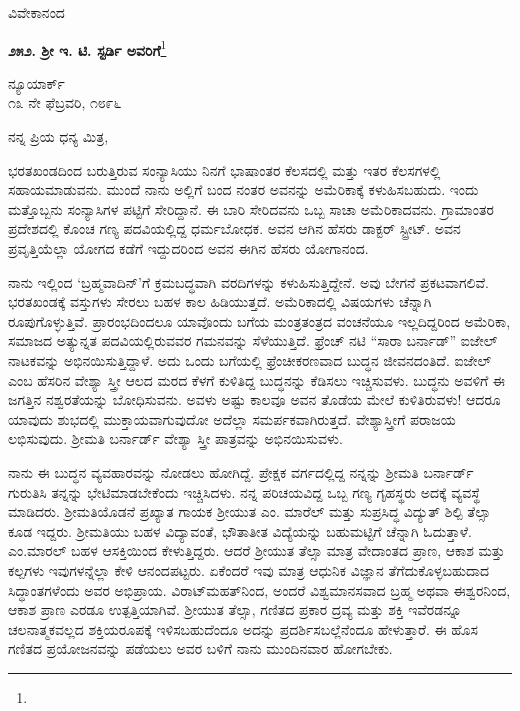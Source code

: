 {\flushright
ವಿವೇಕಾನಂದ\par}

\begin{center}
\textbf{೨೫೨. ಶ‍್ರೀ ಇ. ಟಿ. ಸ್ಟರ್ಡಿ ಅವರಿಗೆ}\footnote{}
\end{center}

\vspace{-0.5cm}

\begin{flushright}
ನ್ಯೂಯಾರ್ಕ್\\೧೩ ನೇ ಫೆಬ್ರವರಿ, ೧೮೯೬
\end{flushright}

\vspace{-0.5cm}

\noindent
ನನ್ನ ಪ್ರಿಯ ಧನ್ಯ ಮಿತ್ರ,

ಭರತಖಂಡದಿಂದ ಬರುತ್ತಿರುವ ಸಂನ್ಯಾಸಿಯು ನಿನಗೆ ಭಾಷಾಂತರ ಕೆಲಸದಲ್ಲಿ ಮತ್ತು ಇತರ ಕೆಲಸಗಳಲ್ಲಿ ಸಹಾಯಮಾಡುವನು. ಮುಂದೆ ನಾನು ಅಲ್ಲಿಗೆ ಬಂದ ನಂತರ ಅವನನ್ನು ಅಮೆರಿಕಾಕ್ಕೆ ಕಳುಹಿಸಬಹುದು. ಇಂದು ಮತ್ತೊಬ್ಬನು ಸಂನ್ಯಾಸಿಗಳ ಪಟ್ಟಿಗೆ ಸೇರಿದ್ದಾನೆ. ಈ ಬಾರಿ ಸೇರಿದವನು ಒಬ್ಬ ಸಾಚಾ ಅಮೆರಿಕಾದವನು. ಗ್ರಾಮಾಂತರ ಪ್ರದೇಶದಲ್ಲಿ ಕೊಂಚ ಗಣ್ಯ ಪದವಿಯಲ್ಲಿದ್ದ ಧರ್ಮಬೋಧಕ. ಅವನ ಆಗಿನ ಹೆಸರು ಡಾಕ್ಟರ್ ಸ್ಟ್ರೀಟ್. ಅವನ ಪ್ರವೃತ್ತಿಯೆಲ್ಲಾ ಯೋಗದ ಕಡೆಗೆ ಇದ್ದುದರಿಂದ ಅವನ ಈಗಿನ ಹೆಸರು ಯೋಗಾನಂದ.

ನಾನು ಇಲ್ಲಿಂದ ‘ಬ್ರಹ್ಮವಾದಿನ್’ಗೆ ಕ್ರಮಬದ್ಧವಾಗಿ ವರದಿಗಳನ್ನು ಕಳುಹಿಸುತ್ತಿದ್ದೇನೆ. ಅವು ಬೇಗನೆ ಪ್ರಕಟವಾಗಲಿವೆ. ಭರತಖಂಡಕ್ಕೆ ವಸ್ತುಗಳು ಸೇರಲು ಬಹಳ ಕಾಲ ಹಿಡಿಯುತ್ತದೆ. ಅಮೆರಿಕಾದಲ್ಲಿ ವಿಷಯಗಳು ಚೆನ್ನಾಗಿ ರೂಪುಗೊಳ್ಳುತ್ತಿವೆ. ಪ್ರಾರಂಭದಿಂದಲೂ ಯಾವೊಂದು ಬಗೆಯ ಮಂತ್ರತಂತ್ರದ ವಂಚನೆಯೂ ಇಲ್ಲದಿದ್ದರಿಂದ ಅಮೆರಿಕಾ, ಸಮಾಜ\break ದ ಅತ್ಯುನ್ನತ ಪದವಿಯಲ್ಲಿರುವವರ ಗಮನವನ್ನು ಸೆಳೆಯುತ್ತಿದೆ. ಫ್ರೆಂಚ್ ನಟಿ “ಸಾರಾ ಬರ್ನಾಡ್” ಐಜೇಲ್ ನಾಟಕವನ್ನು ಅಭಿನಯಿಸುತ್ತಿದ್ದಾಳೆ. ಅದು ಒಂದು ಬಗೆಯಲ್ಲಿ ಫ್ರೆಂಚೀಕರಣವಾದ ಬುದ್ಧನ ಜೀವನದಂತಿದೆ. ಐಜೇಲ್ ಎಂಬ ಹೆಸರಿನ ವೇಶ್ಯಾ ಸ್ತ್ರೀ ಆಲದ ಮರದ ಕೆಳಗೆ ಕುಳಿತಿದ್ದ ಬುದ್ಧನನ್ನು ಕೆಡಿಸಲು ಇಚ್ಚಿಸುವಳು. ಬುದ್ಧನು ಅವಳಿಗೆ ಈ ಜಗತ್ತಿನ ನಶ್ವರತೆಯನ್ನು ಬೋಧಿಸುವನು. ಅವಳು ಅಷ್ಟು ಕಾಲವೂ ಅವನ ತೊಡೆಯ ಮೇಲೆ ಕುಳಿತಿರುವಳು! ಆದರೂ ಯಾವುದು ಶುಭದಲ್ಲಿ ಮುಕ್ತಾಯವಾಗುವುದೋ ಅದೆಲ್ಲಾ ಸಮರ್ಪಕವಾಗಿರುತ್ತದೆ. ವೇಶ್ಯಾಸ್ತ್ರೀಗೆ ಪರಾಜಯ ಲಭಿಸುವುದು. ಶ‍್ರೀಮತಿ ಬರ್ನಾರ್ಡ್ ವೇಶ್ಯಾ ಸ್ತ್ರೀ ಪಾತ್ರವನ್ನು ಅಭಿನಯಿಸುವಳು.

ನಾನು ಈ ಬುದ್ಧನ ವ್ಯವಹಾರವನ್ನು ನೋಡಲು ಹೋಗಿದ್ದೆ. ಪ್ರೇಕ್ಷಕ ವರ್ಗದಲ್ಲಿದ್ದ ನನ್ನನ್ನು ಶ‍್ರೀಮತಿ ಬರ್ನಾರ್ಡ್ ಗುರುತಿಸಿ ತನ್ನನ್ನು ಭೇಟಿಮಾಡಬೇಕೆಂದು ಇಚ್ಚಿಸಿದಳು. ನನ್ನ ಪರಿಚಯವಿದ್ದ ಒಬ್ಬ ಗಣ್ಯ ಗೃಹಸ್ಥರು ಅದಕ್ಕೆ ವ್ಯವಸ್ಥೆ ಮಾಡಿದರು. ಶ‍್ರೀಮತಿಯೊಡನೆ ಪ್ರಖ್ಯಾತ ಗಾಯಕ ಶ‍್ರೀಯುತ ಎಂ. ಮಾರೆಲ್ ಮತ್ತು ಸುಪ್ರಸಿದ್ಧ ವಿದ್ಯುತ್ ಶಿಲ್ಪಿ ತೆಲ್ಸಾ ಕೂಡ ಇದ್ದರು. ಶ‍್ರೀಮತಿಯು ಬಹಳ ವಿದ್ಯಾವಂತೆ, ಭೌತಾತೀತ ವಿದ್ಯೆಯನ್ನು ಬಹುಮಟ್ಟಿಗೆ ಚೆನ್ನಾಗಿ ಓದುತ್ತಾಳೆ. ಎಂ.ಮಾರಲ್ ಬಹಳ ಆಸಕ್ತಿಯಿಂದ ಕೇಳುತ್ತಿದ್ದರು. ಆದರೆ ಶ‍್ರೀಯುತ ತೆಲ್ಸಾ ಮಾತ್ರ ವೇದಾಂತದ ಪ್ರಾಣ, ಆಕಾಶ ಮತ್ತು ಕಲ್ಪಗಳು ಇವುಗಳನ್ನೆಲ್ಲಾ ಕೇಳಿ ಆನಂದಪಟ್ಟರು. ಏಕೆಂದರೆ ಇವು ಮಾತ್ರ ಆಧುನಿಕ ವಿಜ್ಞಾನ ತೆಗೆದುಕೊಳ್ಳಬಹುದಾದ ಸಿದ್ಧಾಂತಗಳೆಂದು ಅವರ ಅಭಿಪ್ರಾಯ. ವಿರಾಟ್‌ಮಹತ್‌ನಿಂದ, ಅಂದರೆ ವಿಶ್ವಮಾನಸವಾದ ಬ್ರಹ್ಮ ಅಥವಾ ಈಶ್ವರನಿಂದ, ಆಕಾಶ ಪ್ರಾಣ ಎರಡೂ ಉತ್ಪತ್ತಿಯಾಗಿವೆ. ಶ‍್ರೀಯುತ ತೆಲ್ಸಾ, ಗಣಿತದ ಪ್ರಕಾರ ದ್ರವ್ಯ ಮತ್ತು ಶಕ್ತಿ ಇವೆರಡನ್ನೂ ಚಲನಾತ್ಮಕವಲ್ಲದ ಶಕ್ತಿಯರೂಪಕ್ಕೆ ಇಳಿಸಬಹುದೆಂದೂ ಅದನ್ನು ಪ್ರದರ್ಶಿಸಬಲ್ಲೆನೆಂದೂ ಹೇಳುತ್ತಾರೆ. ಈ ಹೊಸ ಗಣಿತದ ಪ್ರಯೋಜನವನ್ನು ಪಡೆಯಲು ಅವರ ಬಳಿಗೆ ನಾನು ಮುಂದಿನವಾರ ಹೋಗಬೇಕು.

